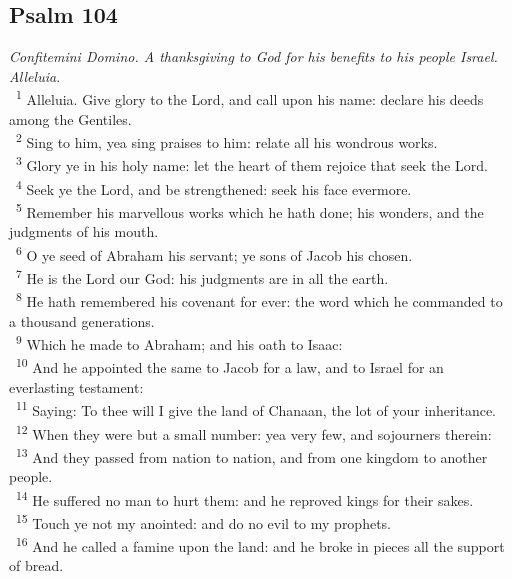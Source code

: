 \documentclass[a5paper,12pt]{article}
\begin{document}
\begin{multicols*}{2}
\section{Psalm 104}
\label{sec:org71decf4}
\emph{Confitemini Domino. A thanksgiving to God for his benefits to his people Israel. Alleluia.}\\

~\textsuperscript{1} Alleluia. Give glory to the Lord, and call upon his name: declare his deeds among the Gentiles.\\
~\textsuperscript{2} Sing to him, yea sing praises to him: relate all his wondrous works.\\
~\textsuperscript{3} Glory ye in his holy name: let the heart of them rejoice that seek the Lord.\\
~\textsuperscript{4} Seek ye the Lord, and be strengthened: seek his face evermore.\\
~\textsuperscript{5} Remember his marvellous works which he hath done; his wonders, and the judgments of his mouth.\\
~\textsuperscript{6} O ye seed of Abraham his servant; ye sons of Jacob his chosen.\\
~\textsuperscript{7} He is the Lord our God: his judgments are in all the earth.\\
~\textsuperscript{8} He hath remembered his covenant for ever: the word which he commanded to a thousand generations.\\
~\textsuperscript{9} Which he made to Abraham; and his oath to Isaac:\\
~\textsuperscript{10} And he appointed the same to Jacob for a law, and to Israel for an everlasting testament:\\
~\textsuperscript{11} Saying: To thee will I give the land of Chanaan, the lot of your inheritance.\\
~\textsuperscript{12} When they were but a small number: yea very few, and sojourners therein:\\
~\textsuperscript{13} And they passed from nation to nation, and from one kingdom to another people.\\
~\textsuperscript{14} He suffered no man to hurt them: and he reproved kings for their sakes.\\
~\textsuperscript{15} Touch ye not my anointed: and do no evil to my prophets.\\
~\textsuperscript{16} And he called a famine upon the land: and he broke in pieces all the support of bread.\\

\end{multicols*}
\end{document}

